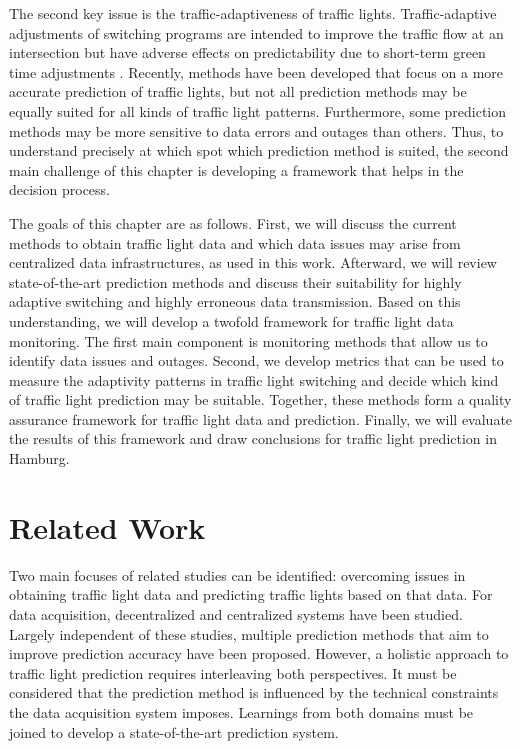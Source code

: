 The second key issue is the traffic-adaptiveness of traffic lights. Traffic-adaptive adjustments of switching programs are intended to improve the traffic flow at an intersection but have adverse effects on predictability due to short-term green time adjustments \cite{schweiger_elisatm_2011, bodenheimer_enabling_2014}. Recently, methods have been developed that focus on a more accurate prediction of traffic lights, but not all prediction methods may be equally suited for all kinds of traffic light patterns. Furthermore, some prediction methods may be more sensitive to data errors and outages than others. Thus, to understand precisely at which spot which prediction method is suited, the second main challenge of this chapter is developing a framework that helps in the decision process.

The goals of this chapter are as follows. First, we will discuss the current methods to obtain traffic light data and which data issues may arise from centralized data infrastructures, as used in this work. Afterward, we will review state-of-the-art prediction methods and discuss their suitability for highly adaptive switching and highly erroneous data transmission. Based on this understanding, we will develop a twofold framework for traffic light data monitoring. The first main component is monitoring methods that allow us to identify data issues and outages. Second, we develop metrics that can be used to measure the adaptivity patterns in traffic light switching and decide which kind of traffic light prediction may be suitable. Together, these methods form a quality assurance framework for traffic light data and prediction. Finally, we will evaluate the results of this framework and draw conclusions for traffic light prediction in Hamburg.

\section{Related Work}

Two main focuses of related studies can be identified: overcoming issues in obtaining traffic light data and predicting traffic lights based on that data. For data acquisition, decentralized and centralized systems have been studied. Largely independent of these studies, multiple prediction methods that aim to improve prediction accuracy have been proposed. However, a holistic approach to traffic light prediction requires interleaving both perspectives. It must be considered that the prediction method is influenced by the technical constraints the data acquisition system imposes. Learnings from both domains must be joined to develop a state-of-the-art prediction system.

